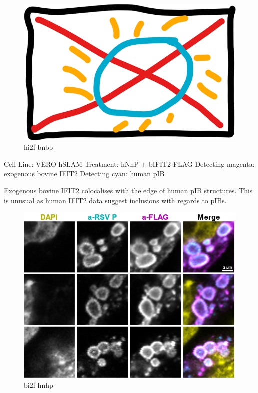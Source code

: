 \begin{figure}
    \centering
    \includegraphics[width=0.5\linewidth]{09. Chapter 4//Figs//03. IFIT2-FLAG/00. placeholder.png}
    \caption[hi2f bnbp]{hi2f bnbp}
    \label{hi2f bnbp}
\end{figure}

Cell Line: VERO hSLAM \newline
Treatment: hNhP + bIFIT2-FLAG \newline
Detecting magenta: exogenous bovine IFIT2 \newline
Detecting cyan: human pIB \newline

Exogenous bovine IFIT2 colocalises with the edge of human pIB structures. This is unusual as human IFIT2 data suggest inclusions with regards to pIBs.

\begin{figure}
    \centering
    \includegraphics[width=1\linewidth]{09. Chapter 4//Figs//03. IFIT2-FLAG/03. bi2f bnbp.png}
    \caption[bi2f hnhp]{bi2f hnhp}
    \label{bi2f hnhp}
\end{figure}

